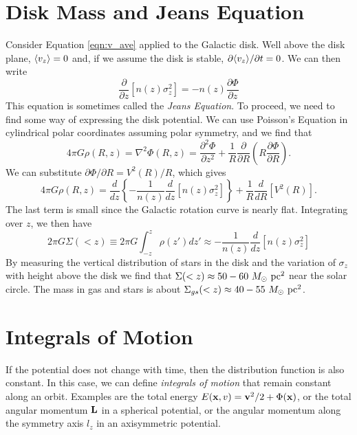 \documentclass[]{article}
\begin{document}
\section{Disk Mass and Jeans Equation}

Consider Equation \ref{eqn:v_ave} applied to the Galactic disk.  Well above the disk
plane, $\langle v_z\rangle=0$ and, if we assume the disk is stable, $\partial\langle v_z\rangle/\partial t=0$.
We can then write
\begin{equation}
\frac{\partial}{\partial z}[n(z)\sigma_z^2] = -n(z)\frac{\partial \Phi}{\partial z}
\end{equation}
\noindent
This equation is sometimes called the {\it Jeans Equation}.
To proceed, we need to find some way of expressing the disk potential. We can use Poisson's 
Equation in cylindrical polar coordinates assuming polar symmetry, and we find that
\begin{equation}
4\pi G \rho(R,z) = \nabla^{2} \Phi(R,z) = \frac{\partial^2\Phi}{\partial z^2} + \frac{1}{R}\frac{\partial}{\partial R}\left(R \frac{\partial \Phi}{\partial R}\right).
\end{equation}
\noindent
We can substitute $\partial \Phi  / \partial R = V^2(R)/R$, which gives
\begin{equation}
4 \pi G \rho(R,z) = \frac{d}{dz}\left\{ - \frac{1}{n(z)}\frac{d}{dz}[n(z)\sigma_z^2]\right\} + \frac{1}{R}\frac{d}{dR}[V^{2}(R)].
\end{equation}
\noindent
The last term is small since the Galactic rotation curve is nearly flat. Integrating over $z$, we then
have
\begin{equation}
2\pi G \Sigma(<z) \equiv 2\pi G\int_{-z}^{z}\rho(z')dz' \approx -\frac{1}{n(z)}\frac{d}{dz}[n(z)\sigma_z^2]
\end{equation}
\noindent
By measuring the vertical distribution of stars in the disk and the variation of $\sigma_z$ with height
above the disk we find that $\Sigma(<z) \approx 50-60~M_{\odot}~\mathrm{pc}^{2}$ near the solar circle.  The mass in
gas and stars is about $\Sigma_{gs}(<z)\approx40-55~M_{\odot}~\mathrm{pc}^{2}$.

\section{Integrals of Motion}

If the potential does not change with time, then the distribution
function is also constant. In this case, we can define {\it integrals of motion} that
remain constant along an orbit.  Examples are the total energy $E(\mathbf{x},v) = \mathbf{v}^2/2 + \Phi(\mathbf{x})$,
or the total angular momentum $\mathbf{L}$ in a spherical potential, or
the angular momentum along the symmetry axis $l_z$ in an axisymmetric potential.
\end{document}
